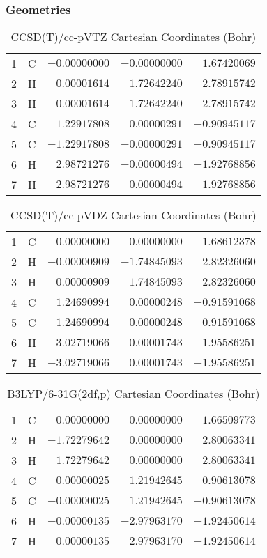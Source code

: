 \documentclass[10pt,oneside]{article}
\begin{document}
\subsubsection*{Geometries}
\begin{table}[h!]
\centering
\caption{CCSD(T)/cc-pVTZ Cartesian Coordinates (Bohr)}
\begin{tabular}{llrrr}
1  & C  & $-0.00000000$ & $-0.00000000$ & $ 1.67420069$ \\
2  & H  & $ 0.00001614$ & $-1.72642240$ & $ 2.78915742$ \\
3  & H  & $-0.00001614$ & $ 1.72642240$ & $ 2.78915742$ \\
4  & C  & $ 1.22917808$ & $ 0.00000291$ & $-0.90945117$ \\
5  & C  & $-1.22917808$ & $-0.00000291$ & $-0.90945117$ \\
6  & H  & $ 2.98721276$ & $-0.00000494$ & $-1.92768856$ \\
7  & H  & $-2.98721276$ & $ 0.00000494$ & $-1.92768856$ \\
\end{tabular}
\end{table}

\begin{table}[h!]
\centering
\caption{CCSD(T)/cc-pVDZ Cartesian Coordinates (Bohr)}
\begin{tabular}{llrrr}
1  & C  & $ 0.00000000$ & $-0.00000000$ & $ 1.68612378$ \\
2  & H  & $-0.00000909$ & $-1.74845093$ & $ 2.82326060$ \\
3  & H  & $ 0.00000909$ & $ 1.74845093$ & $ 2.82326060$ \\
4  & C  & $ 1.24690994$ & $ 0.00000248$ & $-0.91591068$ \\
5  & C  & $-1.24690994$ & $-0.00000248$ & $-0.91591068$ \\
6  & H  & $ 3.02719066$ & $-0.00001743$ & $-1.95586251$ \\
7  & H  & $-3.02719066$ & $ 0.00001743$ & $-1.95586251$ \\
\end{tabular}
\end{table}

\begin{table}[h!]
\centering
\caption{B3LYP/6-31G(2df,p) Cartesian Coordinates (Bohr)}
\begin{tabular}{llrrr}
1  & C  & $ 0.00000000$ & $ 0.00000000$ & $ 1.66509773$ \\
2  & H  & $-1.72279642$ & $ 0.00000000$ & $ 2.80063341$ \\
3  & H  & $ 1.72279642$ & $ 0.00000000$ & $ 2.80063341$ \\
4  & C  & $ 0.00000025$ & $-1.21942645$ & $-0.90613078$ \\
5  & C  & $-0.00000025$ & $ 1.21942645$ & $-0.90613078$ \\
6  & H  & $-0.00000135$ & $-2.97963170$ & $-1.92450614$ \\
7  & H  & $ 0.00000135$ & $ 2.97963170$ & $-1.92450614$ \\
\end{tabular}
\end{table}
\end{document}

